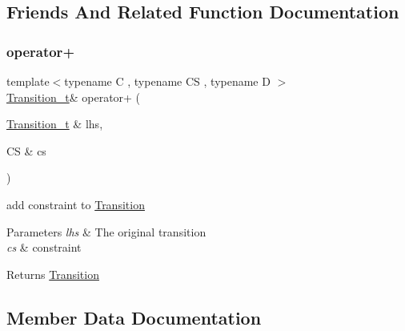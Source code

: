 \subsection{Friends And Related Function Documentation}
\mbox{\label{classgraphsat_1_1_transition_ab2da70aa54b7aab66ef0294fd1a0d519}} 
\subsubsection{\texorpdfstring{operator+}{operator+}}
{\footnotesize\ttfamily template$<$typename C , typename CS , typename D $>$ \\
\mbox{\hyperlink{classgraphsat_1_1_transition_ae0650c39cf272493d16d1fd1b01b6075}{Transition\+\_\+t}}\& operator+ (\begin{DoxyParamCaption}\item[{\mbox{\hyperlink{classgraphsat_1_1_transition_ae0650c39cf272493d16d1fd1b01b6075}{Transition\+\_\+t}} \&}]{lhs,  }\item[{CS \&}]{cs }\end{DoxyParamCaption})\hspace{0.3cm}{\ttfamily [friend]}}

add constraint to \mbox{\hyperlink{classgraphsat_1_1_transition}{Transition}}


\begin{DoxyParams}{Parameters}
{\em lhs} & The original transition \\
\hline
{\em cs} & constraint\\
\hline
\end{DoxyParams}
\begin{DoxyReturn}{Returns}
\mbox{\hyperlink{classgraphsat_1_1_transition}{Transition}} 
\end{DoxyReturn}


\subsection{Member Data Documentation}
\mbox{\label{classgraphsat_1_1_transition_af85c7164e1f45a5cf6bcd87d7d17e4cf}} 
